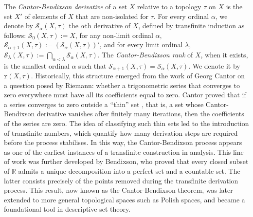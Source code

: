 \documentclass{article}
\newcommand\rst{\bgroup\markoverwith{\textcolor{red}{\rule[0.5ex]{2pt}{0.4pt}}}\ULon}
\begin{document}
The \textit{Cantor-Bendixson derivative} of a set $X$ relative to a topology $\tau$ on $X$ is the set $X'$ of elements of $X$ that are non-isolated for $\tau$. For every ordinal $\alpha$, we denote by 
$\mathcal{S}_{\alpha}(X,\tau)$ the $\alpha$th derivative of $X$, defined by transfinite induction as follows: $\mathcal{S}_{0}(X,\tau) := X$, for any non-limit ordinal $\alpha$, $\mathcal{S}_{\alpha+1}(X,\tau) := (\mathcal{S}_{\alpha}(X,\tau))'$, and for every limit ordinal $\lambda$, $\mathcal{S}_{\lambda}(X,\tau) := \bigcap_{\alpha < \lambda}\mathcal{S}_{\alpha}(X,\tau)$. The \textit{Cantor-Bendixson rank} of $X$, when it exists, is the smallest ordinal $\alpha$ such that $\mathcal{S}_{\alpha+1}(X,\tau) = \mathcal{S}_{\alpha}(X,\tau)$. We denote it by $\texttt{r}(X,\tau)$. Historically, this structure emerged from the work of Georg Cantor on a question posed by Riemann: whether a trigonometric series that converges to zero everywhere must have all its coefficients equal to zero. Cantor proved that if a series converges to zero outside a {``thin''} set 
{, that is, a set whose Cantor-Bendixson derivative vanishes after finitely many iterations}, then the coefficients of the series are zero. The idea of classifying such thin sets %
{led to the introduction} of transfinite numbers, 
{which quantify how many derivation steps are required before the process stabilises}. In this way, the Cantor-Bendixson process appears as one of the earliest instances of a transfinite construction in analysis. This line of work was further developed by Bendixson, who proved that every closed subset of $\mathbb{R}$ 
{admits a unique decomposition} into a perfect set and a countable set.
{The latter consists precisely of the points removed during the transfinite derivation} process. This result, now known as the Cantor-Bendixson theorem, was later extended to more general topological spaces such as Polish spaces, and became a foundational tool in descriptive set theory.
\end{document}
